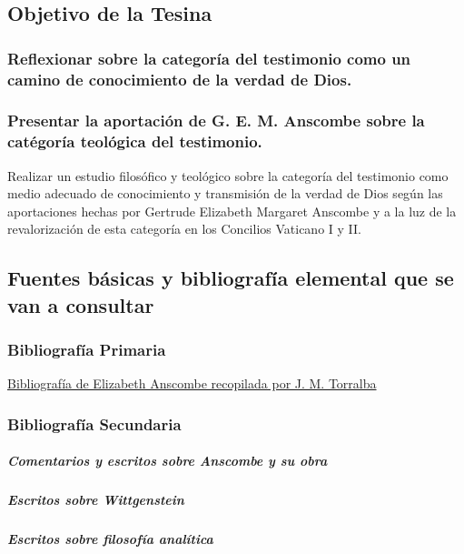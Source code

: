 \documentclass[12pt]{article}
\begin{document}
\subsection{Objetivo de la Tesina}
\subsubsection{Reflexionar sobre la categoría del testimonio como un camino de conocimiento de la verdad de Dios.}
\subsubsection{Presentar la aportación de G. E. M. Anscombe sobre la catégoría teológica del testimonio.}

Realizar un estudio filosófico y teológico sobre la categoría del testimonio como medio adecuado de conocimiento y transmisión de la verdad de Dios según las aportaciones hechas por Gertrude Elizabeth Margaret Anscombe y a la luz de la revalorización de esta categoría en los Concilios Vaticano I y II.


\subsection{Fuentes básicas y bibliografía elemental que se van a consultar}
\subsubsection{Bibliografía Primaria}
\href{http://www.unav.es/filosofia/jmtorralba/anscombe/G.E.M.\_Anscombe\_Bibliography.htm}{Bibliografía de Elizabeth Anscombe recopilada por J. M. Torralba}
\subsubsection{Bibliografía Secundaria}
\subparagraph{Comentarios y escritos sobre Anscombe y su obra}
\subparagraph{Escritos sobre Wittgenstein}
\subparagraph{Escritos sobre filosofía analítica}


\printbibliography
\end{document}
